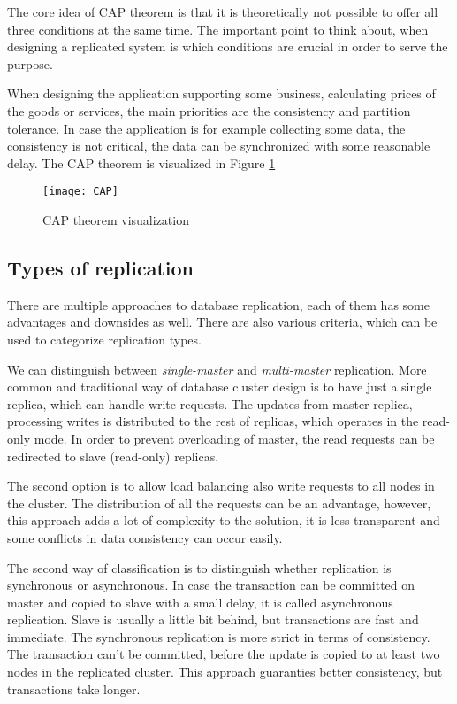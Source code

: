 \documentclass[
  digital, %
  twoside, %
  table,   %
  lof,     %
  lot,     %
]{fithesis3}
\begin{document}
The core idea of CAP theorem is that it is theoretically not possible to offer all three conditions at the same time. The important point to think about, when designing a replicated system is which conditions are crucial in order to serve the purpose.

When designing the application supporting some business, calculating prices of the goods or services, the main priorities are the  consistency and partition tolerance. In case the application is for example collecting some data, the consistency is not critical, the data can be synchronized with some reasonable delay. The CAP theorem is visualized in Figure \ref{fig:cap}

\begin{figure}[H]
\caption{CAP theorem visualization}
\centering
\texttt{[image: CAP]}
\label{fig:cap}
\end{figure}

\subsection{Types of replication} \label{sec:types_of_replication}
There are multiple approaches to database replication, each of them has some advantages and downsides as well. There are also various criteria, which can be used to categorize replication types.

We can distinguish between \textit{single-master} and  \textit{multi-master} replication. More common and traditional way of database cluster design is to have just a single replica, which can handle write requests. The updates from master replica, processing writes is distributed to the rest of replicas, which operates in the read-only mode. In order to prevent overloading of master, the read requests can be redirected to slave (read-only) replicas.

The second option is to allow load balancing also write requests to all nodes in the cluster. The distribution of all the requests can be an advantage, however, this approach adds a lot of complexity to the solution, it is less transparent and some conflicts in data consistency can occur easily.

The second way of classification is to distinguish whether replication is synchronous or asynchronous. In case the transaction can be committed on master and copied to slave with a small delay, it is called asynchronous replication. Slave is usually a little bit behind, but transactions are fast and immediate. The synchronous replication is more strict in terms of consistency. The transaction can't be committed, before the update is copied to at least two nodes in the replicated cluster. This approach guaranties better consistency, but transactions take longer.
\end{document}
